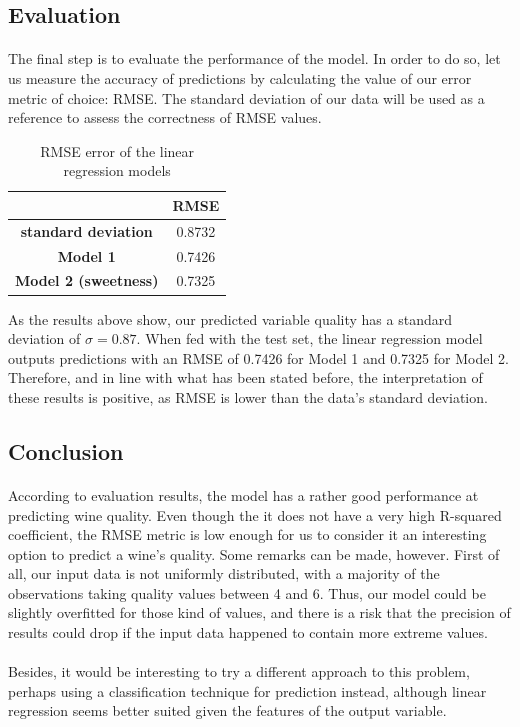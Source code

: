 \documentclass[10pt]{article}
\begin{document}
\subsection{Evaluation}

\paragraph*{}
The final step is to evaluate the performance of the model. In order to do so, let us measure the accuracy of predictions by calculating the value of our error metric of choice: RMSE. The standard deviation of our data will be used as a reference to assess the correctness of RMSE values.

\begin{table}[H]
	\centering
	
	\begin{tabular}{|c|c|}
		\hline
		& \textbf{RMSE} \\ \hline
		\textbf{standard deviation} & 0.8732        \\ \hline
		\textbf{Model 1}            & 0.7426         \\ \hline
		\textbf{Model 2 (sweetness)}            & 0.7325         \\ \hline
	\end{tabular}
	\caption{RMSE error of the linear regression models}
	\label{rmsel}
\end{table}


As the results above show, our predicted variable quality has a standard deviation of $\sigma = 0.87$. When fed with the test set, the linear regression model outputs predictions with an
RMSE of 0.7426 for Model 1 and 0.7325 for Model 2. Therefore, and in line with what has been stated before, the interpretation of these results is positive, as RMSE is lower than the data’s standard deviation.

\subsection{Conclusion}

\paragraph*{}
According to evaluation results, the model has a rather good performance at predicting wine quality. Even though the it does not have a very high R-squared coefficient, the RMSE metric is low enough for us to consider it an interesting option to predict a wine's quality. Some remarks can be made, however. First of all, our input data is not uniformly distributed, with a majority of the observations taking quality values between 4 and 6. Thus, our model could be slightly overfitted for those kind of values, and there is a risk that the precision of results could drop if the input data happened to contain more extreme values. 

\paragraph*{}
Besides, it would be interesting to try a different approach to this problem, perhaps using a classification technique for prediction instead, although linear regression seems better suited given the features of the output variable. 
\end{document}
